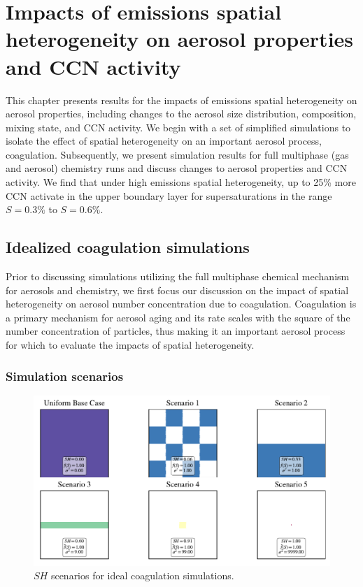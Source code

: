 \chapter{Impacts of emissions spatial heterogeneity on aerosol properties and CCN activity}

This chapter presents results for the impacts of emissions spatial heterogeneity on aerosol properties, including changes to the aerosol size distribution, composition, mixing state, and CCN activity. We begin with a set of simplified simulations to isolate the effect of spatial heterogeneity on an important aerosol process, coagulation. Subsequently, we present simulation results for full multiphase (gas and aerosol) chemistry runs and discuss changes to aerosol properties and CCN activity. We find that under high emissions spatial heterogeneity, up to 25\% more CCN activate in the upper boundary layer for supersaturations in the range $S=0.3\%$ to $S=0.6\%$. 
\section{Idealized coagulation simulations}

Prior to discussing simulations utilizing the full multiphase chemical mechanism for aerosols and chemistry, we first focus our discussion on the impact of spatial heterogeneity on aerosol number concentration due to coagulation. Coagulation is a primary mechanism for aerosol aging and its rate scales with the square of the number concentration of particles, thus making it an important aerosol process for which to evaluate the impacts of spatial heterogeneity. 

\subsection{Simulation scenarios}

\begin{figure}[h]
  \centering
    \includegraphics[width=\textwidth]{figures/chapter5/ideal-coag/ideal-coag-SH-scenarios.pdf}
    \caption{$SH$ scenarios for ideal coagulation simulations.}
    \label{fig:sh-scenarios-ideal-coag}
\end{figure}

